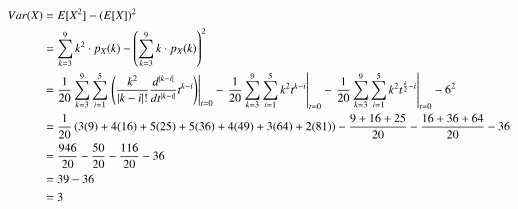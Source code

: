 \documentclass[journal,12pt,onecolumn]{IEEEtran}
\theoremstyle{remark}
\begin{document}
\begin{align}
	Var(X) &= E[X^2] - (E[X])^2\\
	&= \sum_{k=3}^9k^2\cdot p_X(k)-\left(\sum_{k=3}^9k\cdot p_X(k)\right)^2\\
	&= \frac{1}{20}\sum_{k=3}^9\sum_{i=1}^5\left.\left(\frac{k^2}{|k-i|!}\frac{d^{|k-i|}}{dt^{|k-i|}}t^{k-i}\right) \right |_{t=0} - \left.\frac{1}{20}\sum_{k=3}^9\sum_{i=1}^5k^2t^{k-i}\right |_{t=0} - \left.\frac{1}{20}\sum_{k=3}^9\sum_{i=1}^5k^2t^{\frac{k}{2}-i}\right |_{t=0}-6^2\\
	&= \frac{1}{20}\left(3(9)+4(16)+5(25)+5(36)+4(49)+3(64)+2(81)\right)-\frac{9+16+25}{20}-\frac{16+36+64}{20} - 36\\
	&= \frac{946}{20}-\frac{50}{20}-\frac{116}{20} - 36\\
	&= 39-36\\
	&= 3
\end{align}
\end{document}
